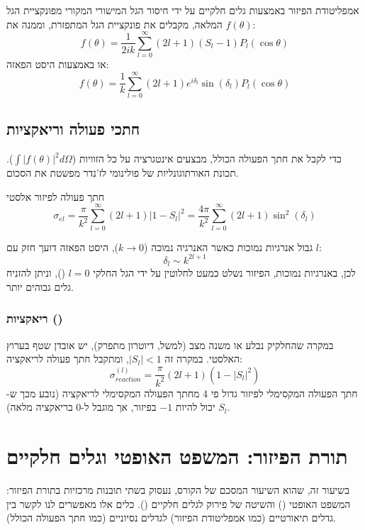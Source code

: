 \begin{resultbox}{אמפליטודת הפיזור באמצעות גלים חלקיים}
על ידי חיסור הגל המישורי המקורי מפונקציית הגל המלאה, מקבלים את פונקציית הגל המתפזרת, וממנה את $f(\theta)$:
\[
f(\theta) = \frac{1}{2ik} \sum_{l=0}^{\infty} (2l+1) (S_l - 1) P_l(\cos\theta)
\]
או באמצעות היסט הפאזה:
\[
f(\theta) = \frac{1}{k} \sum_{l=0}^{\infty} (2l+1) e^{i\delta_l}\sin(\delta_l) P_l(\cos\theta)
\]
\end{resultbox}

\subsection{חתכי פעולה וריאקציות}

כדי לקבל את חתך הפעולה הכולל, מבצעים אינטגרציה על כל הזוויות ($\int |f(\theta)|^2 d\Omega$). תכונת האורתוגונליות של פולינומי לז'נדר מפשטת את הסכום.

\begin{mainbox}{חתך פעולה לפיזור אלסטי}
\[
\sigma_{el} = \frac{\pi}{k^2} \sum_{l=0}^{\infty} (2l+1) |1 - S_l|^2 = \frac{4\pi}{k^2} \sum_{l=0}^{\infty} (2l+1) \sin^2(\delta_l)
\]
\end{mainbox}

\begin{important}{גבול אנרגיות נמוכות}
כאשר האנרגיה נמוכה ($k \to 0$), היסט הפאזה דועך חזק עם $l$:
\[
\delta_l \sim k^{2l+1}
\]
לכן, באנרגיות נמוכות, הפיזור נשלט כמעט לחלוטין על ידי הגל החלקי $l=0$ (), וניתן להזניח גלים גבוהים יותר.
\end{important}

\subsubsection{ריאקציות ()}
במקרה שהחלקיק נבלע או משנה מצב (למשל, דיוטרון מתפרק), יש אובדן שטף בערוץ האלסטי. במקרה זה $|S_l| < 1$, ומתקבל חתך פעולה לריאקציה:
\[
\sigma_{reaction}^{(l)} = \frac{\pi}{k^2} (2l+1) (1 - |S_l|^2)
\]
חתך הפעולה המקסימלי לפיזור גדול פי 4 מחתך הפעולה המקסימלי לריאקציה (נובע מכך ש-$S_l$ יכול להיות $-1$ בפיזור, אך מוגבל ל-$0$ בריאקציה מלאה).




\section{תורת הפיזור: המשפט האופטי וגלים חלקיים}

בשיעור זה, שהוא השיעור המסכם של הקורס, נעסוק בשתי תובנות מרכזיות בתורת הפיזור: המשפט האופטי () והשיטה של פירוק לגלים חלקיים (). כלים אלו מאפשרים לנו לקשר בין גדלים תיאורטיים (כמו אמפליטודת הפיזור) לגדלים נסיוניים (כמו חתך הפעולה הכולל).

